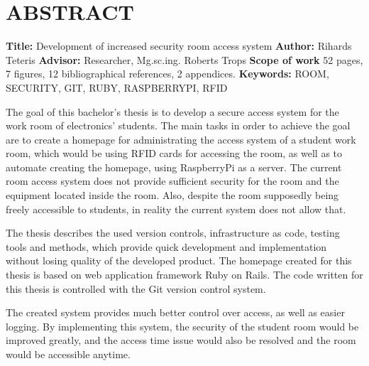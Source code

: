 \chapter*{ABSTRACT}
\noindent \textbf{Title:} Development of increased security room access system\newline
\textbf{Author:} Rihards Teteris\newline
\textbf{Advisor:} Researcher, Mg.sc.ing. Roberts Trops\newline
\textbf{Scope of work} 52 pages, 7 figures, 12 bibliographical references, 2 appendices.\newline
\textbf{Keywords:} ROOM, SECURITY, GIT, RUBY, RASPBERRYPI, RFID\newline

The goal of this bachelor's thesis is to develop a secure access system for the work room of  electronics' students.
The main tasks in order to achieve the goal are to create a homepage for administrating the access system of a student work room, which would be using RFID cards for accessing the room, as well as to automate creating the homepage, using RaspberryPi as a server.
The current room access system does not provide sufficient security for the room and the equipment located inside the room. Also, despite the room supposedly being freely accessible to students, in reality the current system does not allow that.

The thesis describes the used version controls, infrastructure as code, testing tools and methods, which provide quick development and implementation without losing quality of the developed product. The homepage created for this thesis is based on web application framework Ruby on Rails. The code written for this thesis is controlled with the Git version control system.

The created system provides much better control over access, as well as easier logging. By implementing this system, the security of the student room would be improved greatly, and the access time issue would also be resolved and the room would be accessible anytime.
